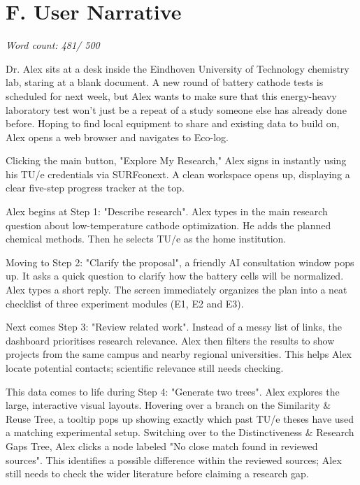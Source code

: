 \documentclass[11pt,a4paper]{article}
\newcommand{\Fwordcount}{481}
\begin{document}
\clearpage
\section*{F. User Narrative}
\noindent\textit{Word count: \Fwordcount / 500}\par\medskip

\noindent Dr. Alex sits at a desk inside the Eindhoven University of Technology chemistry lab, staring at a blank document. A new round of battery cathode tests is scheduled for next week, but Alex wants to make sure that this energy-heavy laboratory test won't just be a repeat of a study someone else has already done before. Hoping to find local equipment to share and existing data to build on, Alex opens a web browser and navigates to Eco-log.

Clicking the main button, "Explore My Research," Alex signs in instantly using his TU/e credentials via SURFconext. A clean workspace opens up, displaying a clear five-step progress tracker at the top.

Alex begins at Step 1: "Describe research". Alex types in the main research question about low-temperature cathode optimization. He adds the planned chemical methods. Then he selects TU/e as the home institution.

Moving to Step 2: "Clarify the proposal", a friendly AI consultation window pops up. It asks a quick question to clarify how the battery cells will be normalized. Alex types a short reply. The screen immediately organizes the plan into a neat checklist of three experiment modules (E1, E2 and E3).

Next comes Step 3: "Review related work". Instead of a messy list of links, the dashboard prioritises research relevance. Alex then filters the results to show projects from the same campus and nearby regional universities. This helps Alex locate potential contacts; scientific relevance still needs checking.

This data comes to life during Step 4: "Generate two trees". Alex explores the large, interactive visual layouts. Hovering over a branch on the Similarity \& Reuse Tree, a tooltip pops up showing exactly which past TU/e theses have used a matching experimental setup. Switching over to the Distinctiveness \& Research Gaps Tree, Alex clicks a node labeled "No close match found in reviewed sources". This identifies a possible difference within the reviewed sources; Alex still needs to check the wider literature before claiming a research gap.
\end{document}
